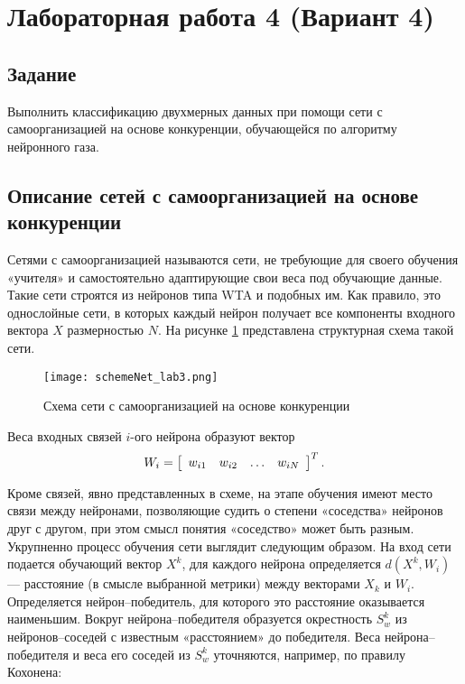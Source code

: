 \section{Лабораторная работа 4 (Вариант 4)}
\subsection{Задание}

Выполнить классификацию двухмерных данных при помощи сети с самоорганизацией на основе конкуренции, обучающейся по алгоритму нейронного газа.

\subsection{Описание сетей с самоорганизацией на основе конкуренции}
Сетями с самоорганизацией называются сети, не требующие для своего
обучения «учителя» и самостоятельно адаптирующие свои веса под обучающие
данные. Такие сети строятся из нейронов типа WTA и подобных
им. Как правило, это однослойные сети, в которых каждый нейрон получает
все компоненты входного вектора $X$ размерностью $N$. На рисунке \ref{img:schemeNet_lab3}
представлена структурная схема такой сети.

\begin{figure}[H]
\centering
\texttt{[image: schemeNet\_lab3.png]}
\caption{Схема сети с самоорганизацией на основе конкуренции}
\label{img:schemeNet_lab3}
\end{figure}

Веса входных связей $i$-ого нейрона образуют вектор
\begin{equation}
    W_{i} = \left[ \begin{array} { l l l l }{w_{i 1}} & {w_{i 2}}&{\dots}&{w_{ i N }}\end{array}\right]^{T} .
\end{equation}

Кроме связей, явно представленных в схеме, на этапе обучения имеют место
связи между нейронами, позволяющие судить о степени «соседства»
нейронов друг с другом, при этом смысл понятия «соседство» может
быть разным.
Укрупненно процесс обучения сети выглядит следующим образом. На
вход сети подается обучающий вектор $X^k$, для каждого нейрона определяется
$d(X^k, W_i)$ — расстояние (в смысле выбранной метрики) между
векторами $X_k$ и $W_i$. Определяется нейрон–победитель, для которого это
расстояние оказывается наименьшим. Вокруг нейрона–победителя образуется окрестность $S^k_w$ из нейронов–соседей с известным «расстоянием» до победителя. Веса нейрона–победителя и веса его соседей из $S^k_w$ уточняются, например, по правилу Кохонена:

